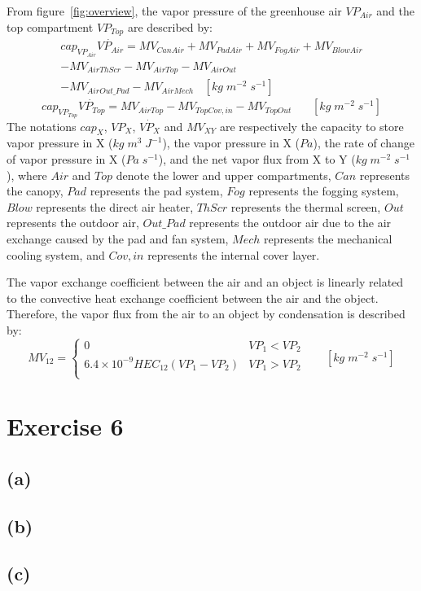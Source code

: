 \documentclass[a4paper]{article}
\begin{document}
From figure~\ref{fig:overview}, the vapor pressure of the greenhouse air \(VP_{Air}\) and the top compartment \(VP_{Top}\) are described by: \\
\begin{multline}
  cap_{VP_{Air}}\dot{VP_{Air}} = MV_{CanAir} + MV_{PadAir} + MV_{FogAir} + MV_{BlowAir} \\
  - MV_{AirThScr} - MV_{AirTop} - MV_{AirOut} \\
  - MV_{AirOut\_Pad} - MV_{AirMech} ~~~~ [kg\;m^{-2}\;s^{-1}]
\end{multline}
\begin{equation}
  cap_{VP_{Top}}\dot{VP_{Top}} = MV_{AirTop} - MV_{TopCov,in} - MV_{TopOut} ~~~~~~~~ [kg\;m^{-2}\;s^{-1}]
\end{equation}
The notations \(cap_X\), \(VP_X\), \(\dot{VP_X}\) and \(MV_{XY}\) are respectively the capacity to store vapor pressure in X (\(kg\;m^3\;J^{-1}\)),
the vapor pressure in X (\(Pa\)), the rate of change of vapor pressure in X (\(Pa\;s^{-1}\)), and the net vapor flux from X to Y (\(kg\;m^{-2}\;s^{-1}\)),
where \(Air\) and \(Top\) denote the lower and upper compartments, \(Can\) represents the canopy, \(Pad\) represents the pad system, \(Fog\) represents the fogging system,
\(Blow\) represents the direct air heater, \(ThScr\) represents the thermal screen, \(Out\) represents the outdoor air,
\(Out\_Pad\) represents the outdoor air due to the air exchange caused by the pad and fan system, \(Mech\) represents the mechanical cooling system,
and \(Cov,in\) represents the internal cover layer.

The vapor exchange coefficient between the air and an object is linearly related to the convective heat exchange coefficient between the air and the object.
Therefore, the vapor flux from the air to an object by condensation is described by:
\begin{equation}
  MV_{12} = \begin{cases}
    0                                        & VP_1 < VP_2 \\
    6.4 \times 10^{-9} HEC_{12}(VP_1 - VP_2) & VP_1 > VP_2 \\
  \end{cases}
  ~~~~~~~~ [kg\;m^{-2}\;s^{-1}]
\end{equation}


\newpage
\section{Exercise 6}
\subsection{(a)}

\subsection{(b)}

\subsection{(c)}

\begin{thebibliography}{80}






\end{thebibliography}
\end{document}

